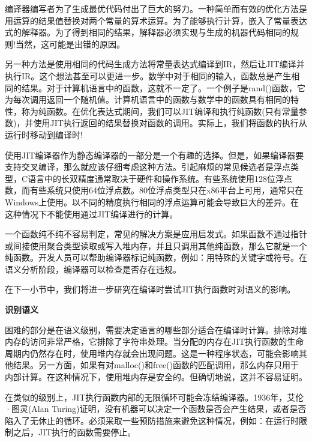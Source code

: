 编译器编写者为了生成最优代码付出了巨大的努力。一种简单而有效的优化方法是用运算的结果值替换对两个常量的算术运算。为了能够执行计算，嵌入了常量表达式的解释器。为了得到相同的结果，解释器必须实现与生成的机器代码相同的规则!当然，这可能是出错的原因。\par

另一种方法是使用相同的代码生成方法将常量表达式编译到IR，然后让JIT编译并执行IR。这个想法甚至可以更进一步。数学中对于相同的输入，函数总是产生相同的结果。对于计算机语言中的函数，这就不一定了。一个例子是rand()函数，它为每次调用返回一个随机值。计算机语言中的函数与数学中的函数具有相同的特性，称为纯函数。在优化表达式期间，我们可以JIT编译和执行纯函数(只有常量参数)，并使用JIT执行返回的结果替换对函数的调用。实际上，我们将函数的执行从运行时移动到编译时!\par

\begin{tcolorbox}[colback=blue!5!white,colframe=blue!75!black, title=交叉编译]
使用JIT编译器作为静态编译器的一部分是一个有趣的选择。但是，如果编译器要支持交叉编译，那么就应该仔细考虑这种方法。引起麻烦的常见候选者是浮点类型，C语言中的长双精度通常取决于硬件和操作系统。有些系统使用128位浮点数，而有些系统只使用64位浮点数。80位浮点类型只在x86平台上可用，通常只在Windows上使用。以不同的精度执行相同的浮点运算可能会导致巨大的差异。在这种情况下不能使用通过JIT编译进行的计算。
\end{tcolorbox}

一个函数纯不纯不容易判定，常见的解决方案是应用启发式。如果函数不通过指针或间接使用聚合类型读取或写入堆内存，并且只调用其他纯函数，那么它就是一个纯函数。开发人员可以帮助编译器标记纯函数，例如：用特殊的关键字或符号。在语义分析阶段，编译器可以检查是否存在违规。\par

在下一小节中，我们将进一步研究在编译时尝试JIT执行函数时对语义的影响。\par

\hspace*{\fill} \par %
\textbf{识别语义}

困难的部分是在语义级别，需要决定语言的哪些部分适合在编译时计算。排除对堆内存的访问非常严格，它排除了字符串处理。当分配的内存在JIT执行函数的生命周期内仍然存在时，使用堆内存就会出现问题。这是一种程序状态，可能会影响其他结果。另一方面，如果有对malloc()和free()函数的匹配调用，那么内存只用于内部计算。在这种情况下，使用堆内存是安全的。但确切地说，这并不容易证明。\par

在类似的级别上，JIT执行函数内部的无限循环可能会冻结编译器。1936年，艾伦·图灵(Alan Turing)证明，没有机器可以决定一个函数是否会产生结果，或者是否陷入了无休止的循环。必须采取一些预防措施来避免这种情况，例如：在运行时限制之后，JIT执行的函数需要停止。\par

